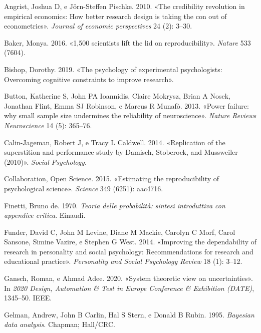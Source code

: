 \documentclass[
  letterpaper,
  krantz2]{{[}./krantz{]}}
\newlength{\cslhangindent}
\newenvironment{CSLReferences}[2] %
 {\begin{list}{}{%
  \setlength{\itemindent}{0pt}
  \setlength{\leftmargin}{0pt}
  \setlength{\parsep}{0pt}
  \ifodd #1
   \setlength{\leftmargin}{\cslhangindent}
   \setlength{\itemindent}{-1\cslhangindent}
  \fi
  \setlength{\itemsep}{#2\baselineskip}}}
 {\end{list}}
\begin{document}
\label{refs}
\begin{CSLReferences}{1}{0}
Angrist, Joshua D, e Jörn-Steffen Pischke. 2010. {«The credibility
revolution in empirical economics: How better research design is taking
the con out of econometrics»}. \emph{Journal of economic perspectives}
24 (2): 3--30.

Baker, Monya. 2016. {«1,500 scientists lift the lid on
reproducibility»}. \emph{Nature} 533 (7604).

Bishop, Dorothy. 2019. {«The psychology of experimental psychologists:
Overcoming cognitive constraints to improve research»}.

Button, Katherine S, John PA Ioannidis, Claire Mokrysz, Brian A Nosek,
Jonathan Flint, Emma SJ Robinson, e Marcus R Munafò. 2013. {«Power
failure: why small sample size undermines the reliability of
neuroscience»}. \emph{Nature Reviews Neuroscience} 14 (5): 365--76.

Calin-Jageman, Robert J, e Tracy L Caldwell. 2014. {«Replication of the
superstition and performance study by Damisch, Stoberock, and Mussweiler
(2010)»}. \emph{Social Psychology}.

Collaboration, Open Science. 2015. {«Estimating the reproducibility of
psychological science»}. \emph{Science} 349 (6251): aac4716.

Finetti, Bruno de. 1970. \emph{Teoria delle probabilit{à}: sintesi
introduttiva con appendice critica}. Einaudi.

Funder, David C, John M Levine, Diane M Mackie, Carolyn C Morf, Carol
Sansone, Simine Vazire, e Stephen G West. 2014. {«Improving the
dependability of research in personality and social psychology:
Recommendations for research and educational practice»}.
\emph{Personality and Social Psychology Review} 18 (1): 3--12.

Gansch, Roman, e Ahmad Adee. 2020. {«System theoretic view on
uncertainties»}. In \emph{2020 Design, Automation \& Test in Europe
Conference \& Exhibition (DATE)}, 1345--50. IEEE.

Gelman, Andrew, John B Carlin, Hal S Stern, e Donald B Rubin. 1995.
\emph{Bayesian data analysis}. Chapman; Hall/CRC.


\end{CSLReferences}
\end{document}
